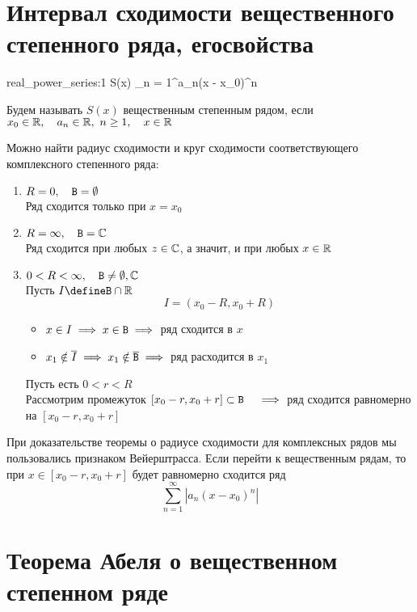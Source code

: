 \section{Интервал сходимости вещественного степенного ряда, его\n свойства}

\begin{definition}
	\begin{equ}{real_power_series:1}
		S(x)  \sum_{n = 1}^\infty a_n(x - x_0)^n
	\end{equ}
	Будем называть $ S(x) $ вещественным степенным рядом, если $ x_0 \in \mathbb{R}, \quad a_n \in \mathbb{R}, ~ n \ge 1, \quad x \in \mathbb{R} $
\end{definition}

Можно найти радиус сходимости и круг сходимости соответствующего комплексного степенного ряда:

\begin{enumerate}
	\item $ R = 0, \quad \mathtt{B} = \emptyset $ \\
	Ряд сходится только при $ x = x_0 $
	\item $ R = \infty, \quad \mathtt{B} = \mathbb{C} $ \\
	Ряд сходится при любых $ z \in \mathbb{C} $, а значит, и при любых $ x \in \mathbb{R} $
	\item $ 0 < R < \infty, \quad \mathtt{B} \ne \emptyset, \mathbb{C} $ \\
	Пусть $ I \define \B \cap \R $
	$$ I = (x_0 - R, x_0 + R) $$
	\begin{itemize}
		\item $ x \in I \implies x \in \mathtt{B} \implies $ ряд сходится в $ x $
		\item $ x_1 \notin \overline I \implies x_1 \notin \overline{\mathtt{B}} \implies $ ряд расходится в $ x_1 $
	\end{itemize}
	Пусть есть $ 0 < r < R $ \\
	Рассмотрим промежуток $ [x_0 - r, x_0 + r] \subset \mathtt{B} \quad \implies $ ряд сходится равномерно на $ [x_0 - r, x_0 + r] $
\end{enumerate}

При доказательстве теоремы о радиусе сходимости для комплексных рядов мы пользовались признаком Вейерштрасса. Если перейти к вещественным рядам, то при $ x \in [x_0 - r, x_0 + r] $ будет равномерно сходится ряд
$$ \sum_{n = 1}^\infty |a_n(x - x_0)^n| $$

\section{Теорема Абеля о вещественном степенном ряде}

